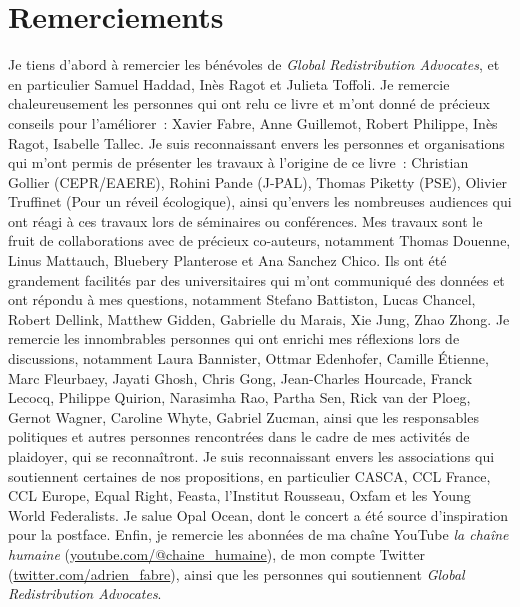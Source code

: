 \documentclass[a5paper,french,openany]{memoir}
\begin{document}
\renewcommand{\url}[1]{\href{#1}{Link}} %
{\small 

}

\clearpage
\section*{Remerciements}\label{sec:merci}  \vspace*{-1cm}
Je tiens d'abord à remercier les bénévoles de \textit{Global Redistribution Advocates}, et en particulier Samuel Haddad, Inès Ragot et Julieta Toffoli. Je remercie chaleureusement les personnes qui ont relu ce livre et m'ont donné de précieux conseils pour l'améliorer~: Xavier Fabre, Anne Guillemot, Robert Philippe, Inès Ragot, Isabelle Tallec. Je suis reconnaissant envers les personnes et organisations qui m'ont permis de présenter les travaux à l'origine de ce livre~: Christian Gollier (CEPR/EAERE), Rohini Pande (J-PAL), Thomas Piketty (PSE), Olivier Truffinet (Pour un réveil écologique), ainsi qu'envers les nombreuses audiences qui ont réagi à ces travaux lors de séminaires ou conférences. Mes travaux sont le fruit de collaborations avec de précieux co-auteurs, notamment Thomas Douenne, Linus Mattauch, Bluebery Planterose et Ana Sanchez Chico. %
Ils ont été grandement facilités par des universitaires qui m'ont communiqué des données et ont répondu à mes questions, notamment Stefano Battiston, Lucas Chancel, Robert Dellink, Matthew Gidden, Gabrielle du Marais, Xie Jung, Zhao Zhong. %
Je remercie les innombrables personnes qui ont enrichi mes réflexions lors de discussions, notamment Laura Bannister, Ottmar Edenhofer, Camille Étienne, Marc Fleurbaey, Jayati Ghosh, Chris Gong, Jean-Charles Hourcade, Franck Lecocq, Philippe Quirion, Narasimha Rao, Partha Sen, Rick van der Ploeg, Gernot Wagner,  Caroline Whyte, Gabriel Zucman, ainsi que les responsables politiques et autres personnes rencontrées dans le cadre de mes activités de plaidoyer, qui se reconnaîtront. Je suis reconnaissant envers les associations qui soutiennent certaines de nos propositions, 
en particulier CASCA, CCL France, CCL Europe, Equal Right, Feasta, l'Institut Rousseau, Oxfam et les Young World Federalists. Je salue Opal Ocean, dont le concert a été source d'inspiration pour la postface. Enfin, je remercie les abonné\textperiodcentered{}e\textperiodcentered{}s de ma chaîne YouTube \textit{la chaîne humaine} (\href{https://www.youtube.com/@chaine_humaine}{youtube.com/@chaine\_humaine}), de mon compte Twitter (\href{https://twitter.com/adrien_fabre}{twitter.com/adrien\_fabre}), ainsi que les personnes qui soutiennent \textit{Global Redistribution Advocates}.

\pagebreak \vspace*{-2cm}
\listoftables \vspace{-1cm}
\listoffigures
\end{document}

